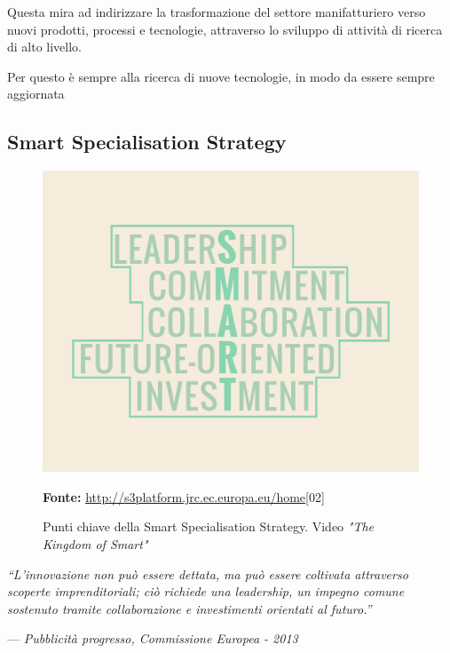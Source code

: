 Questa mira ad indirizzare la trasformazione del settore manifatturiero verso nuovi prodotti, processi e tecnologie, attraverso lo sviluppo di attività di ricerca di alto livello.

Per questo \lab{} è sempre alla ricerca di nuove tecnologie, in modo da essere sempre aggiornata 

\subsection{Smart Specialisation Strategy}
\begin{figure}[H]
	\begin{center}
	\includegraphics[scale=0.13]{immagini/SMART.png}
	\caption{Punti chiave della Smart Specialisation Strategy. Video \textit{"The Kingdom of Smart"}}
	\small{\textbf{Fonte:} \url{http://s3platform.jrc.ec.europa.eu/home}[02]}
	\end{center}
\end{figure}

\begin{flushright}{
	\slshape    
	``L'innovazione non può essere dettata, ma può essere coltivata attraverso scoperte imprenditoriali; ciò richiede una \textit{leadership}, un impegno comune sostenuto tramite collaborazione e investimenti orientati al futuro.''} 
	
	\medskip
    --- \textit{Pubblicità progresso, Commissione Europea - 2013}
\end{flushright}



